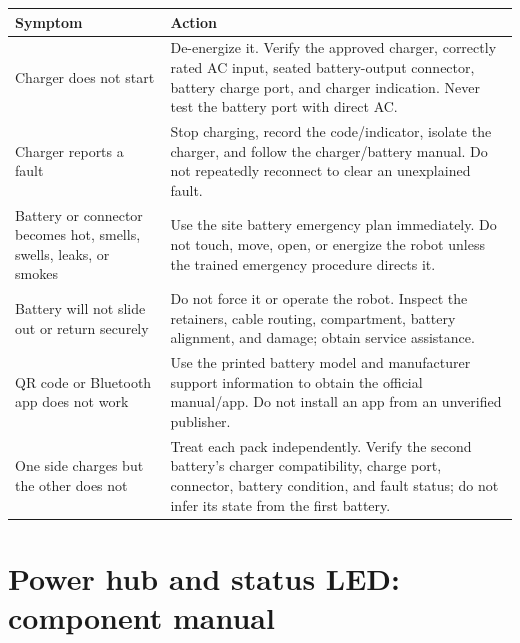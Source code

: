 \documentclass[
  10pt,
  letterpaper,
  openany]{report}
\newcounter{none} %
\begin{document}
{\def\LTcaptype{none} %
\begin{longtable}[]{@{}
  >{\raggedright\arraybackslash}p{}
  >{\raggedright\arraybackslash}p{}@{}}
\toprule\noalign{}
\begin{minipage}[b]{\linewidth}\raggedright
Symptom
\end{minipage} & \begin{minipage}[b]{\linewidth}\raggedright
Action
\end{minipage} \\
\midrule\noalign{}
\endhead
\bottomrule\noalign{}
\endlastfoot
Charger does not start & De-energize it. Verify the approved charger,
correctly rated AC input, seated battery-output connector, battery
charge port, and charger indication. Never test the battery port with
direct AC. \\
Charger reports a fault & Stop charging, record the code/indicator,
isolate the charger, and follow the charger/battery manual. Do not
repeatedly reconnect to clear an unexplained fault. \\
Battery or connector becomes hot, smells, swells, leaks, or smokes & Use
the site battery emergency plan immediately. Do not touch, move, open,
or energize the robot unless the trained emergency procedure directs
it. \\
Battery will not slide out or return securely & Do not force it or
operate the robot. Inspect the retainers, cable routing, compartment,
battery alignment, and damage; obtain service assistance. \\
QR code or Bluetooth app does not work & Use the printed battery model
and manufacturer support information to obtain the official manual/app.
Do not install an app from an unverified publisher. \\
One side charges but the other does not & Treat each pack independently.
Verify the second battery's charger compatibility, charge port,
connector, battery condition, and fault status; do not infer its state
from the first battery. \\
\end{longtable}
}

\protect{}\label{power-hub}
\section{Power hub and status LED: component
manual}\label{power-hub-and-status-led-component-manual}
\end{document}
